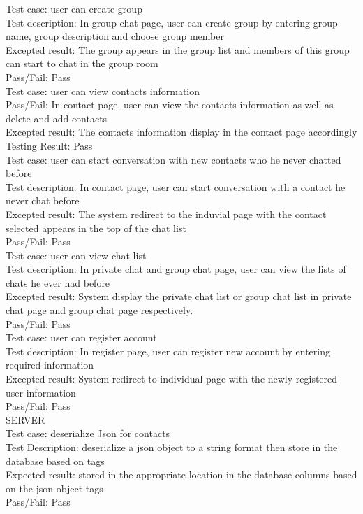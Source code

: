 \documentclass{article}
\begin{document}
\begin{enumerate}
	Test case: user can create group \\
	Test description: In group chat page, user can create group by entering group name, group description and choose group member \\
	Excepted result: The group appears in the group list and members of this group can start to chat in the group room \\
	Pass/Fail: Pass \\
	
	Test case: user can view contacts information \\
	Pass/Fail: In contact page, user can view the contacts information as well as delete and add contacts \\
	Excepted result: The contacts information display in the contact page accordingly \\
	Testing Result: Pass\\
	
	Test case: user can start conversation with new contacts who he never chatted before   \\
	Test description: In contact page, user can start conversation with a contact he never chat before \\ 
	Excepted result: The system redirect to the induvial page with the contact selected appears in the top of the chat list \\
	Pass/Fail: Pass \\
	
	Test case: user can view chat list \\
	Test description: In private chat and group chat page, user can view the lists of chats he ever had before \\ 
	Excepted result: System display the private chat list or group chat list in private chat page and group chat page respectively. \\
	Pass/Fail: Pass \\
	
	Test case: user can register account \\
	Test description: In register page, user can register new account by entering required information \\  
	Excepted result: System redirect to individual page with the newly registered user information \\
	Pass/Fail: Pass \\
	
	SERVER\\
	Test case: deserialize Json for contacts\\
	Test Description: deserialize a json object to  a string format then store in the database based on tags\\
	Expected result: stored in the appropriate location in the database columns based on the json object tags\\
	Pass/Fail: Pass\\
	

\end{enumerate}
\end{document}
